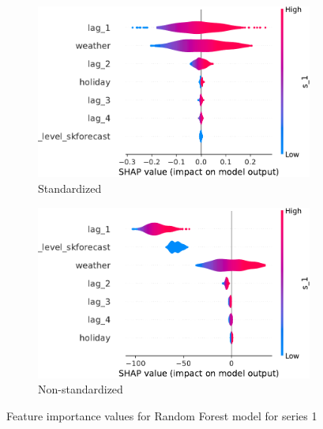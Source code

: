 \begin{figure}
    \centering
    \begin{subfigure}[b]{0.45\textwidth}
        \includegraphics[width=\textwidth]{chapters/04_feature_importance_estimation/img/standardization/lin/rf_forecaster_scaled/shap_violin_s_1}
        \caption{Standardized}
    \end{subfigure}
    \hfill
    \begin{subfigure}[b]{0.45\textwidth}
        \includegraphics[width=\textwidth]{chapters/04_feature_importance_estimation/img/standardization/lin/rf_forecaster_nonscaled/shap_violin_s_1}
        \caption{Non-standardized}
    \end{subfigure}
    \caption{Feature importance values for Random Forest model for series 1}\label{fig:sc_nsc_rf_s1}
\end{figure}

